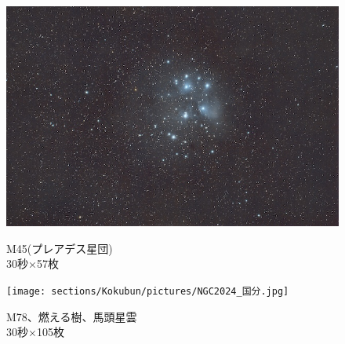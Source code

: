 \begin{figure}[H]
  \centering
  \begin{minipage}{0.48\linewidth}
    \centering
    \includegraphics[width=\linewidth]{sections/Kokubun/pictures/M45.jpg}
    \caption{M45(プレアデス星団)\\
  30秒×57枚}
  \label{M45}
  \end{minipage}
  \begin{minipage}{0.48\linewidth}
    \centering
    \texttt{[image: sections/Kokubun/pictures/NGC2024\_国分.jpg]}
    \caption{M78、燃える樹、馬頭星雲\\
  30秒×105枚}
  \label{M4}
  \end{minipage}
\end{figure}





